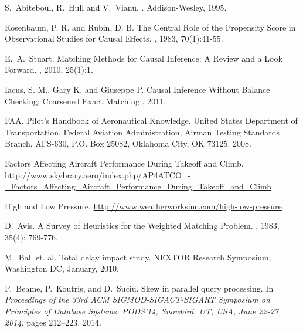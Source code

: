 \begin{thebibliography}{10}



S.~Abiteboul, R.~Hull and V.~Vianu.
.
\newblock Addison-Wesley,   1995.

Rosenbaum, P. R. and Rubin, D. B.
\newblock
The Central Role of
the Propensity Score in Observational Studies for Causal Effects.
, 1983, 70(1):41-55.


 E.~A.~Stuart.
\newblock
Matching Methods for Causal Inference: A Review and a Look Forward.
, 2010, 25(1):1.


Iacus, S. M., Gary K. and Giuseppe P.
\newblock
Causal Inference Without Balance Checking: Coarsened Exact Matching
, 2011.


FAA. Pilot’s Handbook of Aeronautical Knowledge.
\newblock  United States Department of Transportation, Federal Aviation Administration, Airman
Testing Standards Branch, AFS-630, P.O. Box 25082, Oklahoma City, OK 73125. 2008.


\newblock   Factors Affecting Aircraft Performance During Takeoff and Climb.
\newblock  \href{http://www.skybrary.aero/index.php/AP4ATCO\_-\_Factors\_Affecting\_Aircraft\_Performance\_During\_Takeoff\_and\_Climb}
{\small http://www.skybrary.aero/index.php/AP4ATCO\_-\_Factors\_Affecting\_Aircraft\_Performance\_During\_Takeoff\_and\_Climb}


\newblock  High and Low Pressure.
\newblock  \href{http://www.weatherworksinc.com/high-low-pressure}{http://www.weatherworksinc.com/high-low-pressure}



D.~Avis.
\newblock A Survey of Heuristics for the Weighted
Matching Problem.
, 1983, 35(4): 769-776.


M.~Ball et. al.
\newblock Total delay impact
study.
\newblock NEXTOR Research Symposium, Washington DC, January, 2010.







P.~Beame, P.~Koutris, and D.~Suciu.
\newblock Skew in parallel query processing.
\newblock In {\em Proceedings of the 33rd {ACM} {SIGMOD-SIGACT-SIGART}
  Symposium on Principles of Database Systems, PODS'14, Snowbird, UT, USA, June
  22-27, 2014}, pages 212--223, 2014.


\end{thebibliography}
